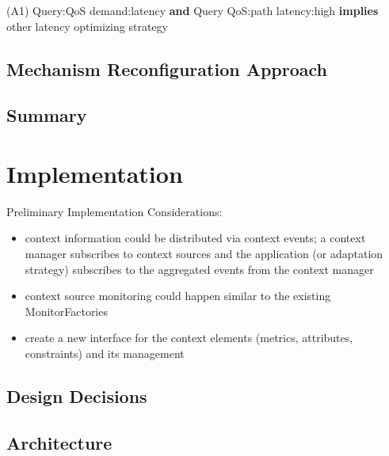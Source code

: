 \begin{center}
(A1) Query:QoS demand:latency \textbf{and} Query QoS:path latency:high \textbf{implies} other latency optimizing strategy\\

\end{center}

\section{Mechanism Reconfiguration Approach}
\section{Summary}


\chapter{Implementation}

Preliminary Implementation Considerations:
\begin{itemize}
\item context information could be distributed via context events; a context manager subscribes to context sources and the application (or adaptation strategy) subscribes to the aggregated events from the context manager
\item context source monitoring could happen similar to the existing MonitorFactories
\item create a new interface for the context elements (metrics, attributes, constraints) and its management
\end{itemize}


\section{Design Decisions}
\section{Architecture}
